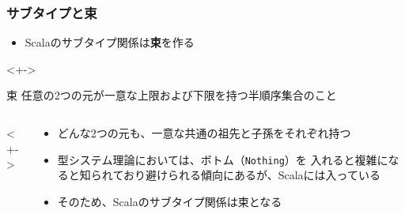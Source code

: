 \begin{frame}[fragile]
  \frametitle{サブタイプと束}

  \pause
  \begin{itemize}
    \item<+-> Scalaのサブタイプ関係は\textbf{束}を作る
  \end{itemize}

  \begin{uncoverenv}<+->
    \begin{block}{束}
      任意の2つの元が一意な上限および下限を持つ半順序集合のこと
    \end{block}
  \end{uncoverenv}

  \begin{columns}
    \begin{column}{0.3\textwidth}
      \begin{center}
        \begin{uncoverenv}<+->
                    
        \end{uncoverenv}
      \end{center}
    \end{column}

    \begin{column}{0.7\textwidth}
      \begin{itemize}
        \item<+-> どんな2つの元も、一意な共通の祖先と子孫をそれぞれ持つ
        \item<+-> 型システム理論においては、ボトム（\lstinline|Nothing|）を
        入れると複雑になると知られており避けられる傾向にあるが、Scalaには入っている
        \item<+-> そのため、Scalaのサブタイプ関係は束となる
      \end{itemize}
    \end{column}
  \end{columns}
\end{frame}

